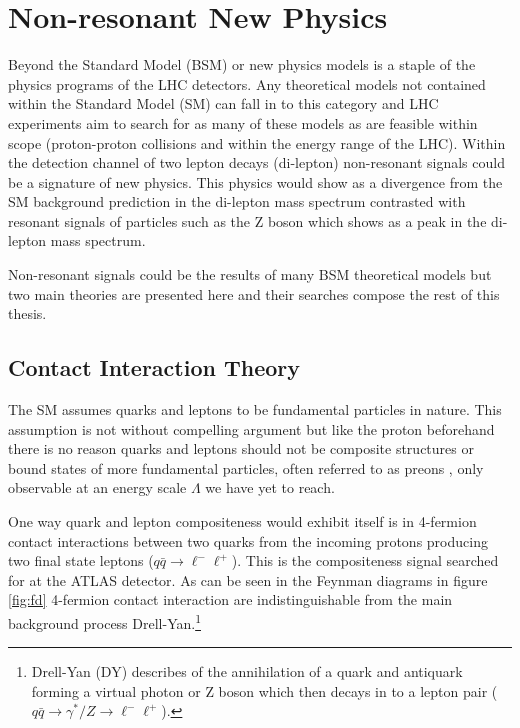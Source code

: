 


\section{Non-resonant New Physics}

    Beyond the Standard Model (BSM) or new physics models is a staple of the physics programs of the LHC detectors. Any theoretical models not contained within the Standard Model (SM) can fall in to this category and LHC experiments aim to search for as many of these models as are feasible within scope (proton-proton collisions and within the energy range of the LHC). Within the detection channel of two lepton decays (di-lepton) non-resonant signals could be a signature of new physics. This physics would show as a divergence from the SM background prediction in the di-lepton mass spectrum contrasted with resonant signals of particles such as the Z boson which shows as a peak in the di-lepton mass spectrum.

    Non-resonant signals could be the results of many BSM theoretical models but two main theories are presented here and their searches compose the rest of this thesis.


    \subsection{Contact Interaction Theory}
        \label{sec:CItheory}

        The SM assumes quarks and leptons to be fundamental particles in nature. This assumption is not without compelling argument but like the proton beforehand there is no reason quarks and leptons should not be composite structures or bound states of more fundamental particles, often referred to as preons \cite{Eichten:1983hw}, only observable at an energy scale $\Lambda$ we have yet to reach. 

        One way quark and lepton compositeness would exhibit itself is in 4-fermion contact interactions between two quarks from the incoming protons producing two final state leptons ($q\bar{q} \rightarrow \ell^{-}\ell^{+}$). This is the compositeness signal searched for at the ATLAS detector. As can be seen in the Feynman diagrams in figure \ref{fig:fd} 4-fermion contact interaction are indistinguishable from the main background process Drell-Yan.\footnote{Drell-Yan (DY) describes of the annihilation of a quark and antiquark forming a virtual photon or Z boson which then decays in to a lepton pair ($q\bar{q} \rightarrow \gamma^{*}/Z \rightarrow \ell^{-}\ell^{+}$).}

